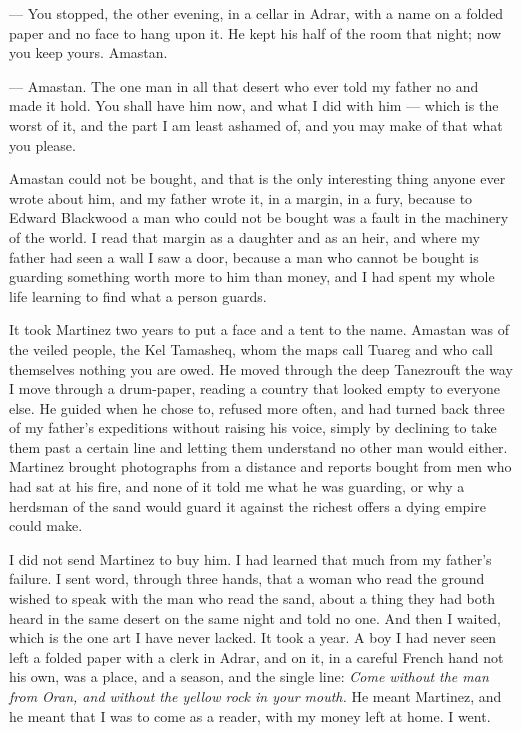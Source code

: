 
\begin{room}

--- You stopped, the other evening, in a cellar in Adrar, with a name on a folded paper and no face to hang upon it. He kept his half of the room that night; now you keep yours. Amastan.

--- Amastan. The one man in all that desert who ever told my father no and made it hold. You shall have him now, and what I did with him --- which is the worst of it, and the part I am least ashamed of, and you may make of that what you please.

\end{room}

Amastan could not be bought, and that is the only interesting thing anyone ever wrote about him, and my father wrote it, in a margin, in a fury, because to Edward Blackwood a man who could not be bought was a fault in the machinery of the world. I read that margin as a daughter and as an heir, and where my father had seen a wall I saw a door, because a man who cannot be bought is guarding something worth more to him than money, and I had spent my whole life learning to find what a person guards.\par

It took Martinez two years to put a face and a tent to the name. Amastan was of the veiled people, the Kel Tamasheq, whom the maps call Tuareg and who call themselves nothing you are owed. He moved through the deep Tanezrouft the way I move through a drum-paper, reading a country that looked empty to everyone else. He guided when he chose to, refused more often, and had turned back three of my father's expeditions without raising his voice, simply by declining to take them past a certain line and letting them understand no other man would either. Martinez brought photographs from a distance and reports bought from men who had sat at his fire, and none of it told me what he was guarding, or why a herdsman of the sand would guard it against the richest offers a dying empire could make.\par

I did not send Martinez to buy him. I had learned that much from my father's failure. I sent word, through three hands, that a woman who read the ground wished to speak with the man who read the sand, about a thing they had both heard in the same desert on the same night and told no one. And then I waited, which is the one art I have never lacked. It took a year. A boy I had never seen left a folded paper with a clerk in Adrar, and on it, in a careful French hand not his own, was a place, and a season, and the single line: \emph{Come without the man from Oran, and without the yellow rock in your mouth.} He meant Martinez, and he meant that I was to come as a reader, with my money left at home. I went.\par


